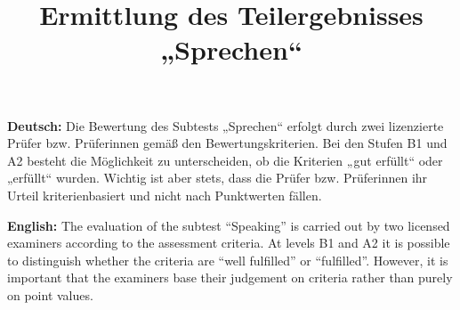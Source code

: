 \documentclass[a4paper]{article}
\title{Ermittlung des Teilergebnisses „Sprechen“}
\date{}
\begin{document}
    \maketitle
        
        \textbf{Deutsch:}
        Die Bewertung des Subtests „Sprechen“ erfolgt durch zwei lizenzierte Prüfer bzw. Prüferinnen gemäß den Bewertungskriterien. Bei den Stufen B1 und A2 besteht die Möglichkeit zu unterscheiden, ob die Kriterien „gut erfüllt“ oder „erfüllt“ wurden. Wichtig ist aber stets, dass die Prüfer bzw. Prüferinnen ihr Urteil kriterienbasiert und nicht nach Punktwerten fällen.
        
        \textbf{English:}
        The evaluation of the subtest “Speaking” is carried out by two licensed examiners according to the assessment criteria. At levels B1 and A2 it is possible to distinguish whether the criteria are “well fulfilled” or “fulfilled”. However, it is important that the examiners base their judgement on criteria rather than purely on point values.
        
\end{document}
